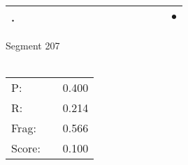 \documentclass[landscape]{article}
\newcommand{\ssp}{\hspace{2pt}}
\newcommand{\mex}{\cellcolor{g}$\bullet$}
\begin{document}
\begin{tabular}{|l|p{10pt}|p{10pt}|p{10pt}|p{10pt}|p{10pt}|p{10pt}|p{10pt}|p{10pt}|p{10pt}|p{10pt}|p{10pt}|p{10pt}|p{10pt}|p{10pt}|}
\ssp \cellcolor{ref13}. \ssp&\hspace{2pt}&\hspace{2pt}&\hspace{2pt}&\hspace{2pt}&\hspace{2pt}&\hspace{2pt}&\hspace{2pt}&\hspace{2pt}&\hspace{2pt}&\hspace{2pt}&\hspace{2pt}&\hspace{2pt}&\hspace{2pt}&\hspace{2pt}\mex\\
\hline
\end{tabular}

\vspace{6pt}
\noindent Segment 207\\\\
\noindent\begin{tabular}{lm{12pt}r}
\hline
P:&&0.400\\
R:&&0.214\\
Frag:&&0.566\\
Score:&&0.100\\
\end{tabular}

\newpage
\end{document}
